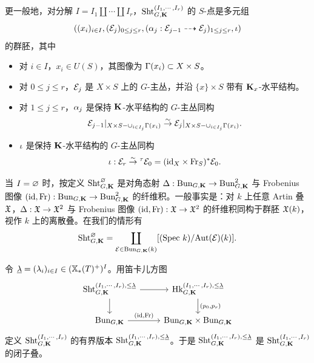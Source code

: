 更一般地，对分解 $I=I_{1}\coprod \cdots\coprod I_{r}$，$\textup{Sht}_{G,\mathbf{K}}^{(I_{1},\cdots, I_{r})}$ 的 $S$-点是多元组
\begin{equation*}
((x_{i})_{i\in I},(\mathcal{E}_{j})_{0\le j\le r}, (\alpha_{j}: \mathcal{E}_{j-1}\dashrightarrow \mathcal{E}_{j})_{1\le j\le r}, \iota)
\end{equation*}
的群胚，其中
\begin{itemize}
\item 对 $i\in I$，$x_{i}\in U(S)$，其图像为 $\Gamma(x_{i})\subset X\times S$。
\item 对 $0\le j\le r$，$\mathcal{E}_{j}$ 是 $X\times S$ 上的 $G$-主丛，并沿 $\{x\}\times S$ 带有 $\mathbf{K}_{x}$-水平结构。
\item 对 $1\le j\le r$，$\alpha_{j}$ 是保持 $\mathbf{K}$-水平结构的 $G$-主丛同构
\begin{equation*}
\mathcal{E}_{j-1}|_{X\times S-\cup_{i\in I_{j}}\Gamma(x_{i})}\stackrel{\sim}{\to} \mathcal{E}_{j}|_{X\times S-\cup_{i\in I_{j}}\Gamma(x_{i})}.
\end{equation*}
\item $\iota$ 是保持 $\mathbf{K}$-水平结构的 $G$-主丛同构
\begin{equation*}
\iota:\mathcal{E}_{r}\stackrel{\sim}{\to} {}^{\tau}\mathcal{E}_{0}=(\textup{id}_{X}\times \textup{Fr}_{S})^{*}\mathcal{E}_{0}.
\end{equation*}
\end{itemize}

\begin{exam}\label{ex:Sht no leg}
当 $I=\varnothing$ 时，按定义 $\textup{Sht}^{\varnothing}_{G,\mathbf{K}}$ 是对角态射 $\Delta: \textup{Bun}_{G,\mathbf{K}}\to \textup{Bun}_{G,\mathbf{K}}^{2}$ 与 Frobenius 图像 $(\textup{id},\textup{Fr}): \textup{Bun}_{G,\mathbf{K}}\to \textup{Bun}_{G,\mathbf{K}}^{2}$ 的纤维积。一般事实是：对 $k$ 上任意 Artin 叠 $\mathfrak{X}$，$\Delta: \mathfrak{X}\to \mathfrak{X}^{2}$ 与 Frobenius 图像 $(\textup{id},\textup{Fr}):\mathfrak{X}\to \mathfrak{X}^{2}$ 的纤维积同构于群胚 $\mathfrak{X}(k)$，视作 $k$ 上的离散叠。在我们的情形有
\begin{equation*}
\textup{Sht}^{\varnothing}_{G,\mathbf{K}}=\coprod_{\mathcal{E}\in \textup{Bun}_{G,\mathbf{K}}(k)}[(\textup{Spec}\  k)/\textup{Aut}(\mathcal{E})(k)].
\end{equation*}
\end{exam}



令 $\underline{\lambda}=(\lambda_{i})_{i\in I}\in (\mathbb{X}_*(T)^{+})^{I}$。用笛卡儿方图
\begin{equation*}
\begin{tikzcd}
\Sht_{G,\bK}^{(I_{1},\cdots, I_{r}),\le\un\l}\arrow[r]\arrow[d] & \Hk_{G,\bK}^{(I_{1},\cdots, I_{r}),\le\un\l}\arrow[d, "{(p_{0},p_{r})}"] \\
\Bun_{G,\bK}\arrow[r, "{(\id,\Fr)}"] & \Bun_{G,\bK}\times \Bun_{G,\bK}
\end{tikzcd}
\end{equation*}
定义 $\textup{Sht}^{(I_{1},\cdots, I_{r})}_{G,\mathbf{K}}$ 的有界版本 $\textup{Sht}^{(I_{1},\cdots, I_{r}), \le \underline{\lambda}}_{G,\mathbf{K}}$。于是 $\textup{Sht}^{(I_{1},\cdots, I_{r}), \le \underline{\lambda}}_{G,\mathbf{K}}$ 是 $\textup{Sht}_{G,\mathbf{K}}^{(I_{1},\cdots, I_{r})}$ 的闭子叠。



